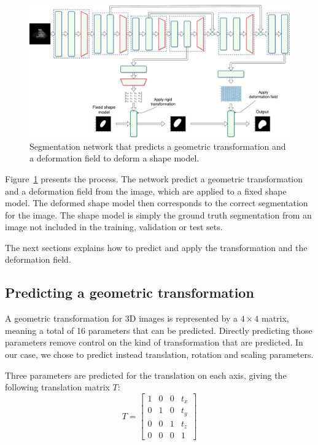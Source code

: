 \begin{figure}[htbp]
	\includegraphics[width=\textwidth]{img_seg/deformation_network}
    \caption{Segmentation network that predicts a geometric transformation and a deformation field to deform a shape model.}
    \label{fig:deform_network}
\end{figure}

Figure~\ref{fig:deform_network} presents the process. The network predict a geometric transformation and a deformation field from the image, which are applied to a fixed shape model. The deformed shape model then corresponds to the correct segmentation for the image. The shape model is simply the ground truth segmentation from an image not included in the training, validation or test sets.

The next sections explains how to predict and apply the transformation and the deformation field.

\subsection{Predicting a geometric transformation}

A geometric transformation for 3D images is represented by a $4 \times 4$ matrix, meaning a total of 16 parameters that can be predicted. Directly predicting those parameters remove control on the kind of transformation that are predicted. In our case, we chose to predict instead translation, rotation and scaling parameters. 

Three parameters are predicted for the translation on each axis, giving the following translation matrix $T$:
\begin{equation*}
    T = 
    \begin{bmatrix}
        1 & 0 & 0 & t_x \\
        0 & 1 & 0 & t_y \\
        0 & 0 & 1 & t_z \\ 
        0 & 0 & 0 & 1
    \end{bmatrix}
\end{equation*}

